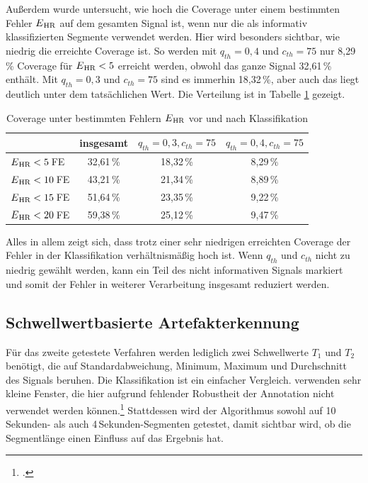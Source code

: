  Außerdem wurde untersucht, wie hoch die Coverage unter einem bestimmten Fehler $E\textsubscript{HR}$ auf dem gesamten Signal ist, wenn nur die als informativ klassifizierten Segmente verwendet werden. Hier wird besonders sichtbar, wie niedrig die erreichte Coverage ist. So werden mit $q_{th}=0{,}4$ und $c_{th}=75$ nur 8{,}29\,\% Coverage für $E\textsubscript{HR} < 5$ erreicht werden, obwohl das ganze Signal 32{,}61\,\% enthält. Mit $q_{th}=0{,}3$ und $c_{th}=75$ sind es immerhin 18{,}32\,\%, aber auch das liegt deutlich unter dem tatsächlichen Wert. Die Verteilung ist in Tabelle \ref{fig:brueser-coverage} gezeigt.
 
 \begin{table}[h]
 	\centering
  	\begin{tabular}{l || c | c | c}
 											& insgesamt 		& $q_{th}=0{,}3, c_{th}=75$ & $q_{th}=0{,}4, c_{th}=75$\\\hline
 		$E\textsubscript{HR} < 5$\,\si{FE} 	&  32{,}61\,\% 	& 18,32\,\% 					& 8,29\,\%	\\
 		$E\textsubscript{HR} < 10$\,\si{FE} 	&  43{,}21\,\% 	& 21,34\,\% 					& 8,89\,\%	\\
 		$E\textsubscript{HR} < 15$\,\si{FE} 	&  51{,}64\,\% 	& 23,35\,\% 					& 9,22\,\%	\\
 		$E\textsubscript{HR} < 20$\,\si{FE} 	&  59{,}38\,\% 	& 25,12\,\% 					& 9,47\,\%\\
 	\end{tabular}
 	\caption[Coverage unter bestimmten Fehlern $E\textsubscript{HR}$ vor und nach Klassifikation]{Coverage unter bestimmten Fehlern $E\textsubscript{HR}$ vor und nach Klassifikation}
 	\label{fig:brueser-coverage}
 \end{table}
 
 Alles in allem zeigt sich, dass trotz einer sehr niedrigen erreichten Coverage der Fehler in der Klassifikation verhältnismäßig hoch ist. Wenn $q_{th}$ und $c_{th}$ nicht zu niedrig gewählt werden, kann ein Teil des nicht informativen Signals markiert und somit der Fehler in weiterer Verarbeitung insgesamt reduziert werden. 
 

\subsection{Schwellwertbasierte Artefakterkennung}

Für das zweite getestete Verfahren werden lediglich zwei Schwellwerte $T_1$ und $T_2$ benötigt, die auf Standardabweichung, Minimum, Maximum und Durchschnitt des Signals beruhen. Die Klassifikation ist ein einfacher Vergleich. \citeauthor{Pino2015} verwenden sehr kleine Fenster, die hier aufgrund fehlender Robustheit der Annotation nicht verwendet werden können.\footcite[]{Pino2015} Stattdessen wird der Algorithmus sowohl auf 10\,Sekunden- als auch 4\,Sekunden-Segmenten getestet, damit sichtbar wird, ob die Segmentlänge einen Einfluss auf das Ergebnis hat.

